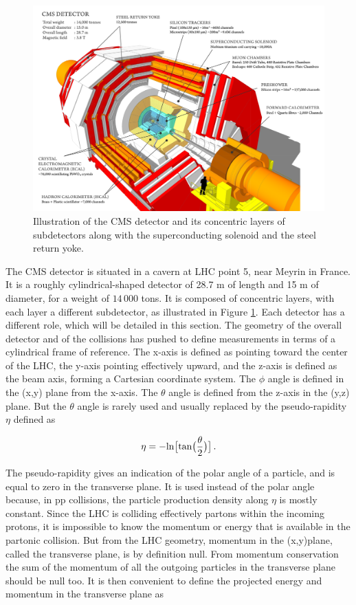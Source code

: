 \begin{figure}
    \centering
    \includegraphics[width=\textwidth]{Images/CMS_subdetectors.png}
    \caption{Illustration of the CMS detector and its concentric layers of subdetectors along with the superconducting solenoid and the steel return yoke.}
    \label{fig:CMS_subdetectors}
\end{figure}

The CMS detector is situated in a cavern at LHC point 5, near Meyrin in France. It is a roughly cylindrical-shaped detector of 28.7 m of length and 15 m of diameter, for a weight of $14\,000$ tons. It is composed of concentric layers, with each layer a different subdetector, as illustrated in Figure \ref{fig:CMS_subdetectors}. Each detector has a different role, which will be detailed in this section. The geometry of the overall detector and of the collisions has pushed to define measurements in terms of a cylindrical frame of reference. The x-axis is defined as pointing toward the center of the LHC, the y-axis pointing effectively upward, and the z-axis is defined as the beam axis, forming a Cartesian coordinate system. The $\phi$ angle is defined in the (x,y) plane from the x-axis. The $\theta$ angle is defined from the z-axis in the (y,z) plane. But the $\theta$ angle is rarely used and usually replaced by the pseudo-rapidity $\eta$ defined as

\begin{equation}
    \eta = - \mathrm{ln} \big[ \mathrm{tan} \big(\frac{\theta}{2}\big)\big] \mend
\end{equation}

The pseudo-rapidity gives an indication of the polar angle of a particle, and is equal to zero in the transverse plane. It is used instead of the polar angle because, in pp collisions, the particle production density along $\eta$ is mostly constant. Since the LHC is colliding effectively partons within the incoming protons, it is impossible to know the momentum or energy that is available in the partonic collision. But from the LHC geometry, momentum in the (x,y)plane, called the transverse plane, is by definition null. From momentum conservation the sum of the momentum of all the outgoing particles in the transverse plane should be null too. It is then convenient to define the projected energy and momentum in the transverse plane as

